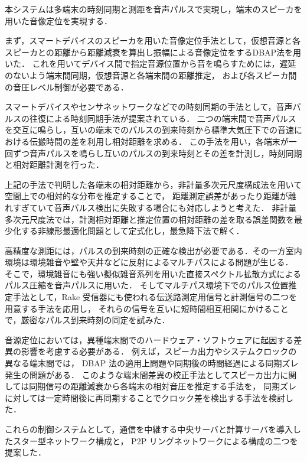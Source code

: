 本システムは多端末の時刻同期と測距を音声パルスで実現し，端末のスピーカを用いた音像定位を実現する．


まず，スマートデバイスのスピーカを用いた音像定位手法として，仮想音源と各スピーカとの距離から距離減衰を算出し振幅による音像定位をするDBAP法を用いた\cite{dbap}．
これを用いてデバイス間で指定音源位置から音を鳴らすためには，遅延のないよう端末間同期，仮想音源と各端末間の距離推定，
および各スピーカ間の音圧レベル制御が必要である．


スマートデバイスやセンサネットワークなどでの時刻同期の手法として，音声パルスの往復による時刻同期手法が提案されている\cite{tpsn}．
二つの端末間で音声パルスを交互に鳴らし，互いの端末でのパルスの到来時刻から標準大気圧下での音速における伝搬時間の差を利用し相対距離を求める．
この手法を用い，各端末が一回ずつ音声パルスを鳴らし互いのパルスの到来時刻とその差を計測し，時刻同期と相対距離計測を行った．


上記の手法で判明した各端末の相対距離から，非計量多次元尺度構成法を用いて空間上での相対的な分布を推定することで，
距離測定誤差があったり距離が離れすぎていて音声パルス検出に失敗する場合にも対応しようと考えた．
非計量多次元尺度法では，計測相対距離と推定位置の相対距離の差を取る誤差関数を最少化する非線形最適化問題として定式化し，最急降下法で解く．


高精度な測距には，パルスの到来時刻の正確な検出が必要である．その一方室内環境は環境雑音や壁や天井などに反射によるマルチパスによる問題が生じる．
そこで，環境雑音にも強い擬似雑音系列を用いた直接スペクトル拡散方式によるパルス圧縮を音声パルスに用いた．
そしてマルチパス環境下でのパルス位置推定手法として，Rake 受信器にも使われる伝送路測定用信号と計測信号の二つを用意する手法を応用し，
それらの信号を互いに短時間相互相関にかけることで，厳密なパルス到来時刻の同定を試みた．


音源定位においては，異種端末間でのハードウェア・ソフトウェアに起因する差異の影響を考慮する必要がある．
例えば，スピーカ出力やシステムクロックの異なる端末間では， DBAP 法の適用上問題や同期後の時間経過による同期ズレ発生の問題がある．
このような端末間差異の校正手法としてスピーカ出力に関しては同期信号の距離減衰から各端末の相対音圧を推定する手法を，
同期ズレに対しては一定時間後に再同期することでクロック差を検出する手法を検討した．


これらの制御システムとして，通信を中継する中央サーバと計算サーバを導入したスター型ネットワーク構成と， P2P リングネットワークによる構成の二つを提案した．
